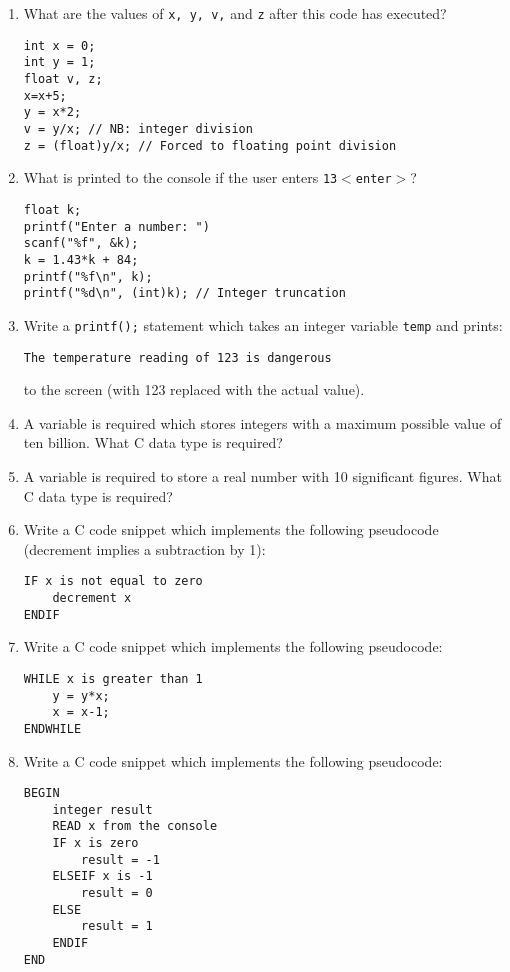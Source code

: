 \documentclass{lab}
\begin{document}
\begin{enumerate}
\item What are the values of \texttt{x, y, v,} and \texttt{z} after this code has executed?
\begin{lstlisting}[style=CStyle]
int x = 0;
int y = 1;
float v, z;
x=x+5;
y = x*2;
v = y/x; // NB: integer division
z = (float)y/x; // Forced to floating point division
\end{lstlisting}
\item What is printed to the console if the user enters \texttt{13$<$enter$>$}?
\begin{lstlisting}[style=CStyle]
float k;
printf("Enter a number: ")
scanf("%f", &k);
k = 1.43*k + 84;
printf("%f\n", k);
printf("%d\n", (int)k); // Integer truncation
\end{lstlisting}
\item Write a \texttt{printf();} statement which takes an integer variable \texttt{temp} and prints:

\texttt{The temperature reading of 123 is dangerous}

to the screen (with 123 replaced with the actual value).
\item A variable is required which stores integers with a maximum possible value of ten billion. What C data type is required?
\item A variable is required to store a real number with 10 significant figures. What C data type is required?
\item Write a C code snippet which implements the following pseudocode (decrement implies a subtraction by 1):
\begin{lstlisting}[style=pseudo]
IF x is not equal to zero
	decrement x
ENDIF
\end{lstlisting}
 
\item Write a C code snippet which implements the following pseudocode:
\begin{lstlisting}[style=pseudo]
WHILE x is greater than 1
	y = y*x;
	x = x-1;
ENDWHILE
\end{lstlisting}
\item Write a C code snippet which implements the following pseudocode:
\begin{lstlisting}[style=pseudo]
BEGIN
	integer result
	READ x from the console
	IF x is zero
		result = -1
	ELSEIF x is -1
		result = 0
	ELSE
		result = 1
	ENDIF
END
\end{lstlisting}
\end{enumerate}
\end{document}
